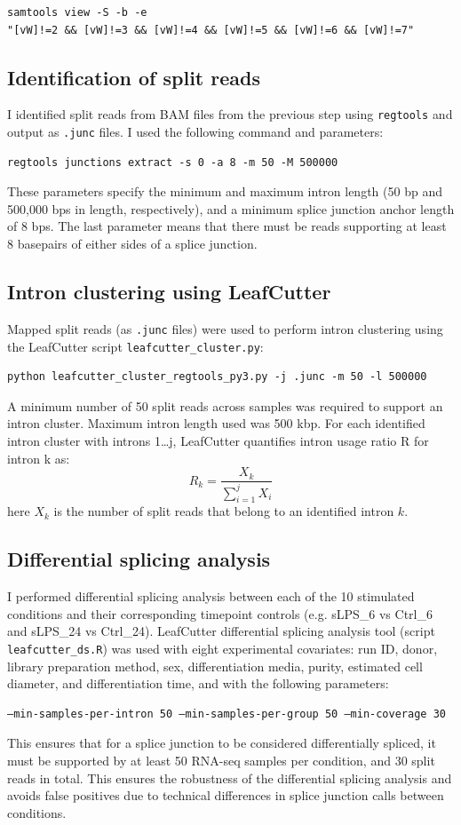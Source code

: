 \begin{verbatim}
samtools view -S -b -e 
"[vW]!=2 && [vW]!=3 && [vW]!=4 && [vW]!=5 && [vW]!=6 && [vW]!=7"
\end{verbatim}

\subsection{Identification of split reads}
I identified split reads from BAM files from the previous step using \Verb_regtools_ \cite{Cotto2023-yp} and output as \Verb_.junc_ files. I used the following command and parameters:
\begin{verbatim}regtools junctions extract -s 0 -a 8 -m 50 -M 500000 \end{verbatim}
These parameters specify the minimum and maximum intron length (50 bp and 500,000 bps in length, respectively), and a minimum splice junction anchor length of 8 bps. The last parameter means that there must be reads supporting at least 8 basepairs of either sides of a splice junction. 

\subsection{Intron clustering using LeafCutter}
Mapped split reads (as \Verb_.junc_ files) were used to perform intron clustering using the LeafCutter script \Verb+leafcutter_cluster.py+:

\begin{verbatim}
python leafcutter_cluster_regtools_py3.py -j .junc -m 50 -l 500000
\end{verbatim}
A minimum number of 50 split reads across samples was required to support an intron cluster. Maximum intron length used was 500 kbp. 
For each identified intron cluster with introns 1…j, LeafCutter quantifies intron usage ratio R for intron k as:
$$R_{k}=\frac{X_k}{ \sum_{i=1}^{j}X_{i} }$$
here $X_k$ is the number of split reads that belong to an identified intron $k$.

\subsection{Differential splicing analysis}
I performed differential splicing analysis between each of the 10 stimulated conditions and their corresponding timepoint controls (e.g. sLPS\_6 vs Ctrl\_6 and sLPS\_24 vs Ctrl\_24). LeafCutter differential splicing analysis tool (script \Verb+leafcutter_ds.R+)\cite{Li2018-ll} was used with eight experimental covariates: run ID, donor, library preparation method, sex, differentiation media, purity, estimated cell diameter, and differentiation time, and with  the following parameters:
\begin{verbatim}
–min-samples-per-intron 50 –min-samples-per-group 50 –min-coverage 30
\end{verbatim}
This ensures that for a splice junction to be considered differentially spliced, it must be supported by at least 50 RNA-seq samples per condition, and 30 split reads in total. This ensures the robustness of the differential splicing analysis and avoids false positives due to technical differences in splice junction calls between conditions.

